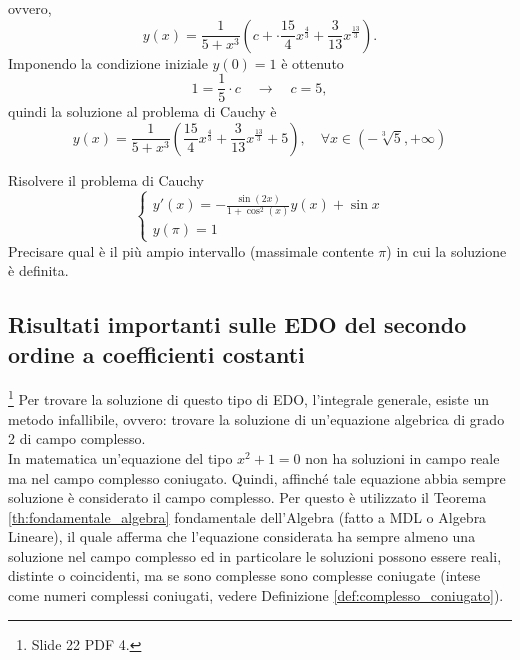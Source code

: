 \begin{example}
    
    \noindent ovvero,
    \begin{equation*}
        y(x)= \frac{1}{5+x^3}\left(c+\cdot\frac{15}{4}x^{\frac{4}{3}} + \frac{3}{13}x^{\frac{13}{3}}\right).
    \end{equation*}
    Imponendo la condizione iniziale $y(0) = 1$ è ottenuto
    \begin{equation*}
        1=\frac{1}{5}\cdot c \quad\rightarrow\quad c=5,
    \end{equation*}
    quindi la soluzione al problema di Cauchy è
    \begin{equation*}
        y(x) = \frac{1}{5+x^3} \left(\frac{15}{4}x^{\frac{4}{3}} + \frac{3}{13}x^{\frac{13}{3}}+5\right),\quad \forall x\in(-\sqrt[3]{5}, +\infty)
    \end{equation*}
\end{example}

\begin{exercise}
    Risolvere il problema di Cauchy
    \begin{equation*}
        \begin{cases}
            y'(x) = -\frac{\sin(2x)}{1+\cos^2(x)}y(x) + \sin x\\
            y(\pi)= 1
        \end{cases}
    \end{equation*}
    Precisare qual è il più ampio intervallo (massimale contente $\pi$) in cui la soluzione è definita.
\end{exercise}

\subsection{Risultati importanti sulle EDO del secondo ordine a coefficienti costanti}\footnote{Slide 22 PDF 4.} 
Per trovare la soluzione di questo tipo di EDO, l'integrale generale, esiste un metodo infallibile, ovvero: trovare la soluzione di un'equazione algebrica di grado 2 di campo complesso.\\
In matematica un'equazione del tipo $x^2+1=0$ non ha soluzioni in campo reale ma nel campo complesso coniugato. Quindi, affinché tale equazione abbia sempre soluzione è considerato il campo complesso. Per questo è utilizzato il Teorema \ref{th:fondamentale_algebra} fondamentale dell'Algebra (fatto a MDL o Algebra Lineare), il quale afferma che l'equazione considerata ha sempre almeno una soluzione nel campo complesso ed in particolare le soluzioni possono essere reali, distinte o coincidenti, ma se sono complesse sono complesse coniugate (intese come numeri complessi coniugati, vedere Definizione \ref{def:complesso_coniugato}).

